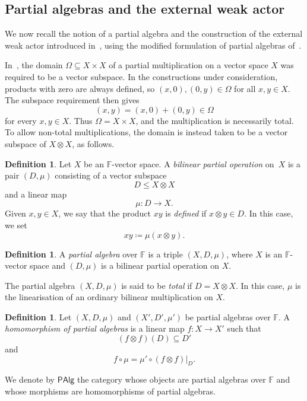 \documentclass[reqno,a4paper]{amsart}
\theoremstyle{plain}
\theoremstyle{definition}
\newtheorem{definition}[subsection]{Definition}
\theoremstyle{remark}
\numberwithin{equation}{section}
\newcommand{\F}{\mathbb{F}}
\newcommand{\PAlg}{\ensuremath{\mathsf{PAlg}}}
\begin{document}
\subsection{Partial algebras and the external weak actor}\label{SecPartialActors}

We now recall the notion of a partial algebra and the construction of the external weak actor introduced in~\cite{WRAAlg}, using the modified formulation of partial algebras of~\cite[Section~4.21]{SurveyActions}.

In~\cite{WRAAlg}, the domain $\Omega\subseteq X\times X$ of a partial multiplication on a vector space $X$ was required to be a vector subspace. In the constructions under consideration, products with zero are always defined, so $(x,0),(0,y)\in\Omega$ for all $x,y\in X$. The subspace requirement then gives
\[
(x,y)=(x,0)+(0,y)\in\Omega
\]
for every $x,y\in X$. Thus $\Omega=X\times X$, and the multiplication is necessarily total. To allow non-total multiplications, the domain is instead taken to be a vector subspace of $X\otimes X$, as follows.

\begin{definition}\cite{SurveyActions}
Let $X$ be an $\F$-vector space. A \emph{bilinear partial operation} on~$X$ is a pair $(D,\mu)$ consisting of a vector subspace
\[
D\leq X\otimes X
\]
and a linear map
\[
\mu\colon D\to X.
\]
Given $x,y\in X$, we say that the product $xy$ is \emph{defined} if $x\otimes y\in D$. In this case, we set
\[
xy\coloneqq\mu(x\otimes y).
\]
\end{definition}

\begin{definition}\cite{SurveyActions}
A \emph{partial algebra} over $\F$ is a triple $(X,D,\mu)$, where $X$ is an $\F$-vector space and $(D,\mu)$ is a bilinear partial operation on $X$.

The partial algebra $(X,D,\mu)$ is said to be \emph{total} if $D=X\otimes X$. In this case, $\mu$ is the linearisation of an ordinary bilinear multiplication on $X$.
\end{definition}

\begin{definition}\cite{SurveyActions}
Let $(X,D,\mu)$ and $(X',D',\mu')$ be partial algebras over $\F$. A \emph{homomorphism of partial algebras} is a linear map $f\colon X\to X'$ such that
\[
(f\otimes f)(D)\subseteq D'
\]
and
\[
f\circ\mu=\mu'\circ\left.(f\otimes f)\right|_D.
\]
\end{definition}

We denote by $\PAlg$ the category whose objects are partial algebras over $\F$ and whose morphisms are homomorphisms of partial algebras.
\end{document}
